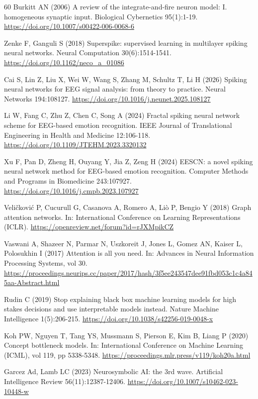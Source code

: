 \begin{thebibliography}{60}
 Burkitt AN (2006) A review of the integrate-and-fire neuron model: I. homogeneous synaptic input. Biological Cybernetics 95(1):1-19. \url{https://doi.org/10.1007/s00422-006-0068-6}

 Zenke F, Ganguli S (2018) Superspike: supervised learning in multilayer spiking neural networks. Neural Computation 30(6):1514-1541. \url{https://doi.org/10.1162/neco_a_01086}

 Cai S, Lin Z, Liu X, Wei W, Wang S, Zhang M, Schultz T, Li H (2026) Spiking neural networks for EEG signal analysis: from theory to practice. Neural Networks 194:108127. \url{https://doi.org/10.1016/j.neunet.2025.108127}

 Li W, Fang C, Zhu Z, Chen C, Song A (2024) Fractal spiking neural network scheme for EEG-based emotion recognition. IEEE Journal of Translational Engineering in Health and Medicine 12:106-118. \url{https://doi.org/10.1109/JTEHM.2023.3320132}

 Xu F, Pan D, Zheng H, Ouyang Y, Jia Z, Zeng H (2024) EESCN: a novel spiking neural network method for EEG-based emotion recognition. Computer Methods and Programs in Biomedicine 243:107927. \url{https://doi.org/10.1016/j.cmpb.2023.107927}

 Veli\v{c}kovi\'c P, Cucurull G, Casanova A, Romero A, Li\`o P, Bengio Y (2018) Graph attention networks. In: International Conference on Learning Representations (ICLR). \url{https://openreview.net/forum?id=rJXMpikCZ}

 Vaswani A, Shazeer N, Parmar N, Uszkoreit J, Jones L, Gomez AN, Kaiser L, Polosukhin I (2017) Attention is all you need. In: Advances in Neural Information Processing Systems, vol 30. \url{https://proceedings.neurips.cc/paper/2017/hash/3f5ee243547dee91fbd053c1c4a845aa-Abstract.html}

 Rudin C (2019) Stop explaining black box machine learning models for high stakes decisions and use interpretable models instead. Nature Machine Intelligence 1(5):206-215. \url{https://doi.org/10.1038/s42256-019-0048-x}

 Koh PW, Nguyen T, Tang YS, Mussmann S, Pierson E, Kim B, Liang P (2020) Concept bottleneck models. In: International Conference on Machine Learning (ICML), vol 119, pp 5338-5348. \url{https://proceedings.mlr.press/v119/koh20a.html}

 Garcez Ad, Lamb LC (2023) Neurosymbolic AI: the 3rd wave. Artificial Intelligence Review 56(11):12387-12406. \url{https://doi.org/10.1007/s10462-023-10448-w}


\end{thebibliography}
